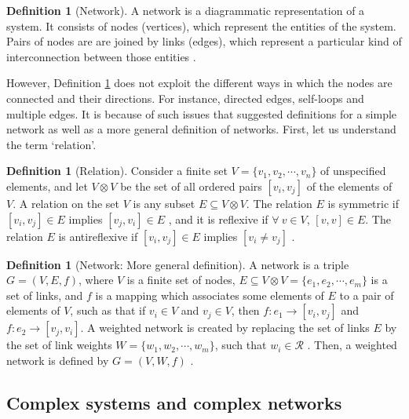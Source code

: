 \documentclass[10pt,a4paper]{article}
\theoremstyle{plain}
\theoremstyle{definition}
\newtheorem{defn}[subsection]{Definition}
\begin{document}
\begin{defn}[Network]
	A network is a diagrammatic representation of a system. It consists of nodes (vertices), which represent the entities of the system. Pairs of nodes are are joined by links (edges), which represent a particular kind of interconnection between those entities \citep{estrada2011structure}.
	\label{def:network}\\
\end{defn}
However, Definition \ref{def:network} does not exploit the different ways in which the nodes are connected and their directions. For instance, directed edges, self-loops and multiple edges. It is because of such issues that \citep{gutman2012mathematical} suggested definitions for a simple network as well as a more general definition of networks. First, let us understand the term `relation'.\\

\begin{defn}[Relation]
	Consider a finite set $V=\{v_1,v_2, \cdots,v_n \}$ of unspecified elements, and let $V \otimes V$ be the set of all ordered pairs $[v_i,v_j]$ of the elements of $V$.
	A relation on the set $V$ is any subset $E \subseteq V \otimes V$. The relation $E$ is symmetric if $[v_i, v_j] \in E$ implies $[v_j, v_i] \in E$ , and it is reflexive if $\forall~ v \in V$, $[v,v] \in E$. The relation $E$ is antireflexive if $[v_i,v_j] \in E$ implies $[v_i \neq v_j]$ \citep{estrada2011structure}.\\
\end{defn}

\begin{defn}[Network: More general definition]
	A network is a triple $ G = (V,E,f)$, where $V$ is a finite set of nodes, $E \subseteq V \otimes V = \{e_1,e_2,\cdots,e_m \} $ is a set of links, and $f$ is a mapping which associates some elements of $E$ to a pair of elements of $V$, such as that if $v_i \in V$ and $v_j \in V$, then $f: e_1 \rightarrow [v_i,v_j]$ and $f:e_2 \rightarrow [v_j,v_i]$. A weighted network is created by replacing the set of links $E$ by the set of link weights   
	$W=\{w_1,w_2,\cdots,w_m \}$, such that $w_i \in \mathcal{R}$ . Then, a weighted network is defined by $G=(V,W,f)$ \citep{estrada2011structure}.\\
\end{defn}



\subsection{Complex systems and complex networks}
\end{document}
